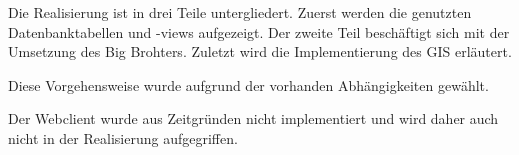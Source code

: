 Die Realisierung ist in drei Teile untergliedert. Zuerst werden die genutzten Datenbanktabellen und -views aufgezeigt. Der zweite Teil beschäftigt sich mit der Umsetzung des Big Brohters. Zuletzt wird die Implementierung des GIS erläutert.

Diese Vorgehensweise wurde aufgrund der vorhanden Abhängigkeiten gewählt.

Der Webclient wurde aus Zeitgründen nicht implementiert und wird daher auch nicht in der Realisierung aufgegriffen.